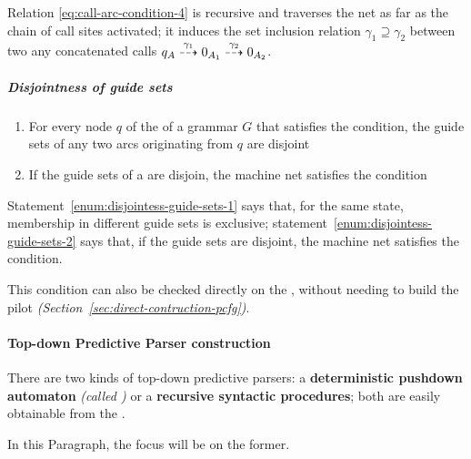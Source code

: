 \documentclass[english]{article}
\begin{document}
Relation \ref{eq:call-arc-condition-4} is recursive and traverses the net as far as the chain of call sites activated;
it induces the set inclusion relation \(\gamma_1 \supseteq \gamma_2\) between two any concatenated calls \(q_A \stackrel{\gamma_1}{\dashrightarrow} 0_{A_1} \stackrel{\gamma_2}{\dashrightarrow} 0_{A_2}\).

\subparagraph*{Disjointness of guide sets}

\begin{enumerate}[label=\arabic*., ref=(\arabic*)]
  \item\label{enum:disjointess-guide-sets-1} For every node \(q\) of the \PCFG of a grammar \(G\) that satisfies the \ello condition, the guide sets of any two arcs originating from \(q\) are disjoint
  \item\label{enum:disjointess-guide-sets-2} If the guide sets of a \PCFG are disjoin, the machine net satisfies the \ello condition
\end{enumerate}

\bigskip
Statement~\ref{enum:disjointess-guide-sets-1} says that, for the same state, membership in different guide sets is exclusive;
statement~\ref{enum:disjointess-guide-sets-2} says that, if the guide sets are disjoint, the machine net satisfies the \ello condition.

This condition can also be checked directly on the \PCFG, without needing to build the \elro pilot \textit{(Section~\ref{sec:direct-contruction-pcfg})}.

\paragraph{Top-down Predictive Parser construction}
\label{par:top-down-predictive-parser-construction}

There are two kinds of top-down predictive parsers:
a \textbf{deterministic pushdown automaton} \textit{(called \DPDA)} or a \textbf{recursive syntactic procedures};
both are easily obtainable from the \PCFG.

In this Paragraph, the focus will be on the former.
\end{document}
